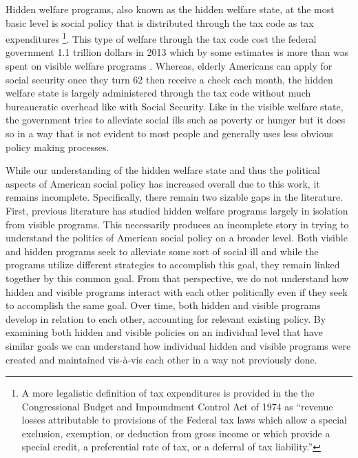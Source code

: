 \documentclass[12pt]{article}
\begin{document}
Hidden welfare programs, also known as the hidden welfare state, at the most basic level is social policy that is distributed through the tax code as tax expenditures \citep{howard1997}\footnote{A more legalistic definition of tax expenditures is provided in the the Congressional Budget and Impoundment Control Act of 1974 as ``revenue losses attributable to provisions of the Federal tax laws which allow a special exclusion, exemption, or deduction from gross income or which provide a special credit, a preferential rate of tax, or a deferral of tax liability.''}.  This type of welfare through the tax code cost the federal government 1.1 trillion dollars in 2013 which by some estimates is more than was spent on visible welfare programs \citep{omb2013}. Whereas, elderly Americans can apply for social security once they turn 62  then receive a check each month, the hidden welfare state is largely administered through the tax code without much bureaucratic overhead like with Social Security. Like in the visible welfare state, the government tries to alleviate social ills such as poverty or hunger but it does so in a way that is not evident to most people and generally uses less obvious policy making processes.

While our understanding of the hidden welfare state and thus the political aspects of American social policy has increased overall due to this work, it remains incomplete.  Specifically, there remain two sizable gaps in the literature. First, previous literature has studied hidden welfare programs largely in isolation from visible programs. This necessarily produces an incomplete story in trying to understand the politics of American social policy on a broader level. Both visible and hidden programs seek to alleviate some sort of social ill and while the programs utilize different strategies to accomplish this goal, they remain linked together by this common goal. From that perspective, we do not understand how hidden and visible programs interact with each other politically even if they seek to accomplish the same goal. Over time, both hidden and visible programs develop in relation to each other, accounting for relevant existing policy. By examining both hidden and visible policies on an individual level that have similar goals we can understand how individual hidden and visible programs were created and maintained vis-à-vis each other in a way not previously done.
\end{document}
